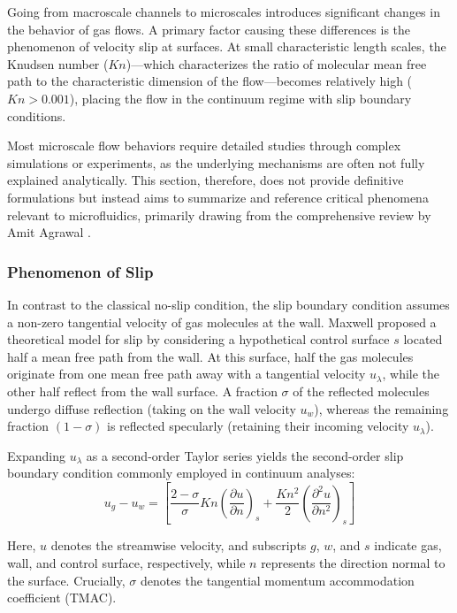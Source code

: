 Going from macroscale channels to microscales introduces significant changes in the behavior of gas flows.
A primary factor causing these differences is the phenomenon of velocity slip at surfaces.
At small characteristic length scales, the Knudsen number ($Kn$)—which characterizes the ratio of molecular mean free path to the characteristic dimension of the flow—becomes relatively high ($Kn > 0.001$), placing the flow in the continuum regime with slip boundary conditions.

Most microscale flow behaviors require detailed studies through complex simulations or experiments, as the underlying mechanisms are often not fully explained analytically.
This section, therefore, does not provide definitive formulations but instead aims to summarize and reference critical phenomena relevant to microfluidics, primarily drawing from the comprehensive review by Amit Agrawal \cite{agrawal_comprehensive_2011}.

\subsubsection*{Phenomenon of Slip}
	In contrast to the classical no-slip condition, the slip boundary condition assumes a non-zero tangential velocity of gas molecules at the wall.
	Maxwell proposed a theoretical model for slip by considering a hypothetical control surface $s$ located half a mean free path from the wall.
	At this surface, half the gas molecules originate from one mean free path away with a tangential velocity $u_\lambda$, while the other half reflect from the wall surface.
	A fraction $\sigma$ of the reflected molecules undergo diffuse reflection (taking on the wall velocity $u_w$), whereas the remaining fraction $(1 - \sigma)$ is reflected specularly (retaining their incoming velocity $u_\lambda$).

	Expanding $u_\lambda$ as a second-order Taylor series yields the second-order slip boundary condition commonly employed in continuum analyses:
	\begin{equation}
		u_g - u_w =
		\left[
			\frac{2-\sigma}{\sigma}Kn\left(\frac{\partial u}{\partial n}\right)_s
			+ \frac{Kn^2}{2} \left(\frac{\partial^2 u}{\partial n^2}\right)_s
		\right]
	\end{equation}

	Here, $u$ denotes the streamwise velocity, and subscripts $g$, $w$, and $s$ indicate gas, wall, and control surface, respectively, while $n$ represents the direction normal to the surface.
	Crucially, $\sigma$ denotes the tangential momentum accommodation coefficient (TMAC).

